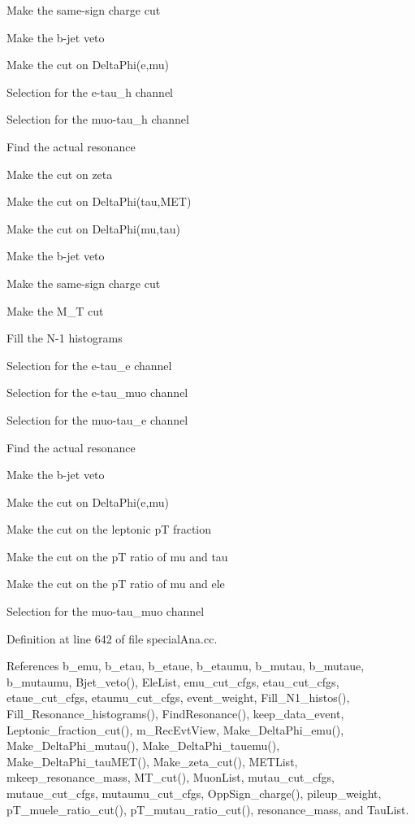 Make the same-\/sign charge cut

Make the b-\/jet veto

Make the cut on Delta\-Phi(e,mu) 

 Selection for the e-\/tau\-\_\-h channel 

 Selection for the muo-\/tau\-\_\-h channel

Find the actual resonance

Make the cut on zeta

Make the cut on Delta\-Phi(tau,\-M\-E\-T)

Make the cut on Delta\-Phi(mu,tau)

Make the b-\/jet veto

Make the same-\/sign charge cut

Make the M\-\_\-\-T cut

Fill the N-\/1 histograms 

 Selection for the e-\/tau\-\_\-e channel 

 Selection for the e-\/tau\-\_\-muo channel 

 Selection for the muo-\/tau\-\_\-e channel

Find the actual resonance

Make the b-\/jet veto

Make the cut on Delta\-Phi(e,mu)

Make the cut on the leptonic p\-T fraction

Make the cut on the p\-T ratio of mu and tau

Make the cut on the p\-T ratio of mu and ele 

 Selection for the muo-\/tau\-\_\-muo channel 

Definition at line 642 of file special\-Ana.\-cc.



References b\-\_\-emu, b\-\_\-etau, b\-\_\-etaue, b\-\_\-etaumu, b\-\_\-mutau, b\-\_\-mutaue, b\-\_\-mutaumu, Bjet\-\_\-veto(), Ele\-List, emu\-\_\-cut\-\_\-cfgs, etau\-\_\-cut\-\_\-cfgs, etaue\-\_\-cut\-\_\-cfgs, etaumu\-\_\-cut\-\_\-cfgs, event\-\_\-weight, Fill\-\_\-\-N1\-\_\-histos(), Fill\-\_\-\-Resonance\-\_\-histograms(), Find\-Resonance(), keep\-\_\-data\-\_\-event, Leptonic\-\_\-fraction\-\_\-cut(), m\-\_\-\-Rec\-Evt\-View, Make\-\_\-\-Delta\-Phi\-\_\-emu(), Make\-\_\-\-Delta\-Phi\-\_\-mutau(), Make\-\_\-\-Delta\-Phi\-\_\-tauemu(), Make\-\_\-\-Delta\-Phi\-\_\-tau\-M\-E\-T(), Make\-\_\-zeta\-\_\-cut(), M\-E\-T\-List, mkeep\-\_\-resonance\-\_\-mass, M\-T\-\_\-cut(), Muon\-List, mutau\-\_\-cut\-\_\-cfgs, mutaue\-\_\-cut\-\_\-cfgs, mutaumu\-\_\-cut\-\_\-cfgs, Opp\-Sign\-\_\-charge(), pileup\-\_\-weight, p\-T\-\_\-muele\-\_\-ratio\-\_\-cut(), p\-T\-\_\-mutau\-\_\-ratio\-\_\-cut(), resonance\-\_\-mass, and Tau\-List.



